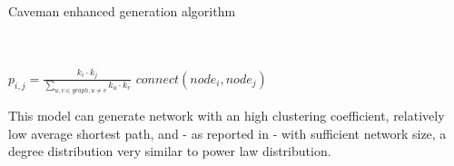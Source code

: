 \begin{algorithm}
\caption{Caveman enhanced generation algorithm}
\label{sn_ca_alg}
\begin{algorithmic}
\STATE
{}\\
\\
		\STATE $p_{i,j}=\frac{k_{i} \cdot k_{j}}{\sum_{u,v \in graph, u \neq v}{k_{u} \cdot k_{v}}}$
	 		\STATE $connect(node_{i},node_{j})$
 		\ENDIF
 	\ENDFOR
\ENDFOR
\end{algorithmic}
\end{algorithm}

This model can generate network with an high clustering coefficient, relatively low average shortest path, and - as reported in\cite{4149781} - with sufficient network size, a degree distribution very similar to power law distribution.
